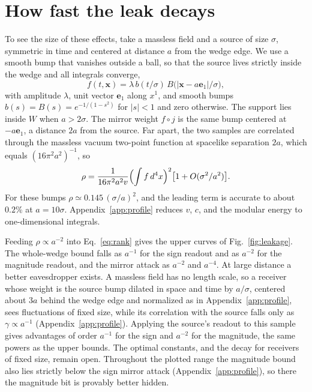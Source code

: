 \documentclass[11pt,a4paper]{article}
\begin{document}
\section{How fast the leak decays}
\label{sec:distance}

To see the size of these effects, take a massless field and a source of size $\sigma$, symmetric in time and centered at distance $a$ from the wedge edge. We use a smooth bump that vanishes outside a ball, so that the source lives strictly inside the wedge and all integrals converge,
\begin{equation}
 f(t,\bm x)=\lambda\,b(t/\sigma)\,B\bigl(|\bm x-a\bm e_1|/\sigma\bigr),
 \label{eq:profile}
\end{equation}
with amplitude $\lambda$, unit vector $\bm e_1$ along $x^1$, and smooth bumps $b(s)=B(s)=e^{-1/(1-s^2)}$ for $|s|<1$ and zero otherwise. The support lies inside $W$ when $a>2\sigma$. The mirror weight $f\circ j$ is the same bump centered at $-a\bm e_1$, a distance $2a$ from the source. Far apart, the two samples are correlated through the massless vacuum two-point function at spacelike separation $2a$, which equals $(16\pi^2a^2)^{-1}$, so
\begin{equation}
 \rho=\frac{1}{16\pi^2a^2v}\Bigl(\int f\,d^4x\Bigr)^2\bigl[1+O(\sigma^2/a^2)\bigr] .
 \label{eq:rhoasym}
\end{equation}
For these bumps $\rho\simeq0.145\,(\sigma/a)^2$, and the leading term is accurate to about $0.2\%$ at $a=10\sigma$. Appendix~\ref{app:profile} reduces $v$, $c$, and the modular energy to one-dimensional integrals.

Feeding $\rho\propto a^{-2}$ into Eq.~\eqref{eq:rank} gives the upper curves of Fig.~\ref{fig:leakage}. The whole-wedge bound falls as $a^{-1}$ for the sign readout and as $a^{-2}$ for the magnitude readout, and the mirror attack as $a^{-2}$ and $a^{-4}$. At large distance a better eavesdropper exists. A massless field has no length scale, so a receiver whose weight is the source bump dilated in space and time by $a/\sigma$, centered about $3a$ behind the wedge edge and normalized as in Appendix~\ref{app:profile}, sees fluctuations of fixed size, while its correlation with the source falls only as $\gamma\propto a^{-1}$ (Appendix~\ref{app:profile}). Applying the source's readout to this sample gives advantages of order $a^{-1}$ for the sign and $a^{-2}$ for the magnitude, the same powers as the upper bounds. The optimal constants, and the decay for receivers of fixed size, remain open. Throughout the plotted range the magnitude bound also lies strictly below the sign mirror attack (Appendix~\ref{app:profile}), so there the magnitude bit is provably better hidden.
\end{document}
